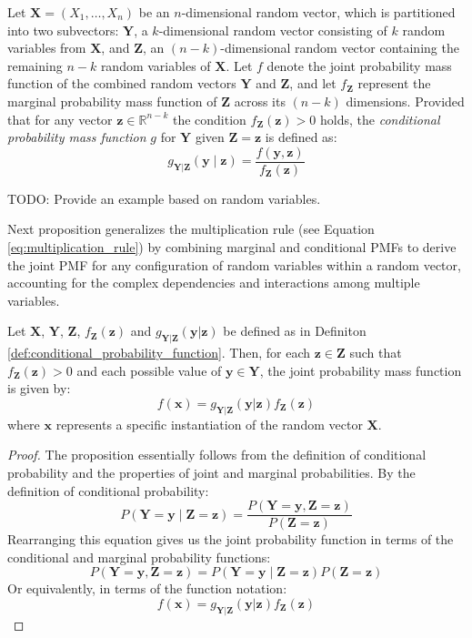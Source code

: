 \begin{definition}
\label{def:conditional_probability_function}
Let $\mathbf{X}=\left(X_{1},\ldots,X_{n}\right)$ be an $n$-dimensional random vector, which is partitioned into two subvectors: $\mathbf{Y}$, a $k$-dimensional random vector consisting of $k$ random variables from $\mathbf{X}$, and $\mathbf{Z}$, an $(n-k)$-dimensional random vector containing the remaining $n-k$ random variables of $\mathbf{X}$. Let $f$ denote the joint probability mass function of the combined random vectors $\mathbf{Y}$ and $\mathbf{Z}$, and let $f_\mathbf{Z}$ represent the marginal probability mass function of $\mathbf{Z}$ across its $(n-k)$ dimensions. Provided that for any vector $\mathbf{z} \in \mathbb{R}^{n-k}$ the condition $f_\mathbf{Z}(\mathbf{z})>0$ holds, the \emph{conditional probability mass function} $g$ for $\mathbf{Y}$ given $\mathbf{Z}=\mathbf{z}$ is defined as:
\[
g_{\mathbf{Y}|\mathbf{Z}} \left(\mathbf{y}\mid\mathbf{z}\right)=\frac{f\left(\mathbf{y},\mathbf{z}\right)}{f_\mathbf{Z} \left(\mathbf{z}\right)}
\]
\end{definition}

\begin{example}
{\color{red} TODO: Provide an example based on random variables.}
\end{example}

Next proposition generalizes the multiplication rule (see Equation \ref{eq:multiplication_rule}) by combining marginal and conditional PMFs to derive the joint PMF for any configuration of random variables within a random vector, accounting for the complex dependencies and interactions among multiple variables.

\begin{proposition}
Let $\mathbf{X}$, $\mathbf{Y}$, $\mathbf{Z}$, $f_{\mathbf{Z}}(\mathbf{z})$ and $g_{\mathbf{Y}|\mathbf{Z}}(\mathbf{y}|\mathbf{z})$ be defined as in Definiton \ref{def:conditional_probability_function}. Then, for each $\mathbf{z} \in \mathbf{Z}$ such that $f_{\mathbf{Z}}(\mathbf{z})>0$ and each possible value of $\mathbf{y} \in \mathbf{Y}$, the joint probability mass function is given by:
\[
f(\mathbf{x}) = g_{\mathbf{Y}|\mathbf{Z}}(\mathbf{y}|\mathbf{z})f_{\mathbf{Z}}(\mathbf{z})
\]
where $\mathbf{x} $ represents a specific instantiation of the random vector $\mathbf{X}$.
\end{proposition}
\begin{proof}
The proposition essentially follows from the definition of conditional probability and the properties of joint and marginal probabilities. By the definition of conditional probability:
\[
P(\mathbf{Y}=\mathbf{y} \mid \mathbf{Z}=\mathbf{z}) = \frac{P(\mathbf{Y}=\mathbf{y}, \mathbf{Z}=\mathbf{z})}{P(\mathbf{Z}=\mathbf{z})}
\]
Rearranging this equation gives us the joint probability function in terms of the conditional and marginal probability functions:
\[
P(\mathbf{Y}=\mathbf{y}, \mathbf{Z}=\mathbf{z}) = P(\mathbf{Y}=\mathbf{y} \mid \mathbf{Z}=\mathbf{z}) P(\mathbf{Z}=\mathbf{z})
 \]
Or equivalently, in terms of the function notation:
\[
f(\mathbf{x}) = g_{\mathbf{Y}|\mathbf{Z}}(\mathbf{y}|\mathbf{z}) f_{\mathbf{Z}}(\mathbf{z})
\]
\end{proof}

